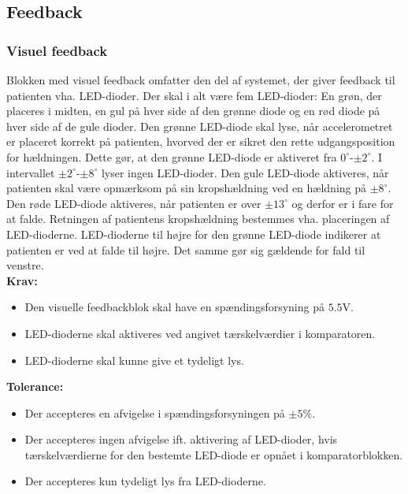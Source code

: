 \subsection{Feedback}
\subsubsection{Visuel feedback}\label{visuel_feedback_krav}
Blokken med visuel feedback omfatter den del af systemet, der giver feedback til patienten vha. LED-dioder. Der skal i alt være fem LED-dioder: En grøn, der placeres i midten, en gul på hver side af den grønne diode og en rød diode på hver side af de gule dioder. Den grønne LED-diode skal lyse, når accelerometret er placeret korrekt på patienten, hvorved der er sikret den rette udgangsposition for hældningen. Dette gør, at den grønne LED-diode er aktiveret fra $0^{\circ}$-$\pm2^{\circ}$. I intervallet $\pm2^{\circ}$-$\pm8^{\circ}$ lyser ingen LED-dioder. Den gule LED-diode aktiveres, når patienten skal være opmærksom på sin kropshældning ved en hældning på $\pm8^{\circ}$. Den røde LED-diode aktiveres, når patienten er over $\pm13^{\circ}$ og derfor er i fare for at falde. Retningen af patientens kropshældning bestemmes vha. placeringen af LED-dioderne. LED-dioderne til højre for den grønne LED-diode indikerer at patienten er ved at falde til højre. Det samme gør sig gældende for fald til venstre. 
\\
\textbf{Krav:}
\begin{itemize}
	\item Den visuelle feedbackblok skal have en spændingsforsyning på  $5.5$V.
	\item LED-dioderne skal aktiveres ved angivet tærskelværdier i komparatoren.
	\item LED-dioderne skal kunne give et tydeligt lys.
\end{itemize}
\textbf{Tolerance:}
\begin{itemize}
	\item Der accepteres en afvigelse i spændingsforsyningen på $\pm5\%$.
	\item Der accepteres ingen afvigelse ift. aktivering af LED-dioder, hvis tærskelværdierne for den bestemte LED-diode er opnået i komparatorblokken.
	\item Der accepteres kun tydeligt lys fra LED-dioderne.
\end{itemize}
